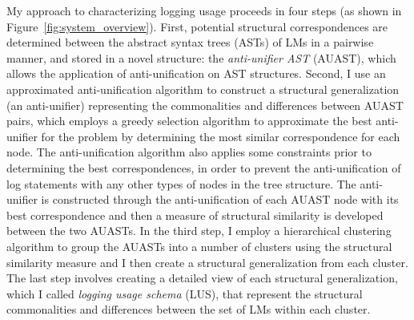 
My approach to characterizing logging usage proceeds in four steps (as shown in Figure~\ref{fig:system_overview}). First, potential structural correspondences are determined between the abstract syntax trees (ASTs) of LMs in a pairwise manner, and stored in a novel structure: the \emph{anti-unifier AST} (AUAST), which allows the application of anti-unification on AST structures. Second, I use an approximated anti-unification algorithm to construct a structural generalization (an anti-unifier) representing the commonalities and differences between AUAST pairs, which employs a greedy selection algorithm to approximate the best anti-unifier for the problem by determining the most similar correspondence for each node. The anti-unification algorithm also applies some constraints prior to determining the best correspondences, in order to prevent the anti-unification of log statements with any other types of nodes in the tree structure. The anti-unifier is constructed through the anti-unification of each AUAST node with its best correspondence and then a measure of structural similarity is developed between the two AUASTs. 
In the third step, I employ a hierarchical clustering algorithm to group the AUASTs into a number of clusters using the structural similarity measure and I then create a structural generalization from each cluster. The last step involves creating a detailed view of each structural generalization, which I called \emph{logging usage schema} (LUS), that represent the structural commonalities and differences between the set of LMs within each cluster.

